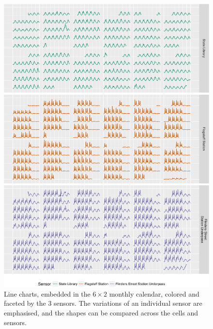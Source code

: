 \documentclass[article]{jss}
\theoremstyle{definition}
\theoremstyle{definition}
\theoremstyle{definition}
\theoremstyle{remark}
\begin{document}
\begin{CodeChunk}
\begin{figure}

{\centering \includegraphics[width=\textwidth]{figure/facet-1} 

}

\caption[Line charts, embedded in the \(6 \times 2\) monthly
calendar, colored and faceted by the 3 sensors. The variations of an
individual sensor are emphasised, and the shapes can be compared across
the cells and sensors.]{Line charts, embedded in the \(6 \times 2\) monthly
calendar, colored and faceted by the 3 sensors. The variations of an
individual sensor are emphasised, and the shapes can be compared across
the cells and sensors.}\label{fig:facet}
\end{figure}
\end{CodeChunk}
\end{document}
